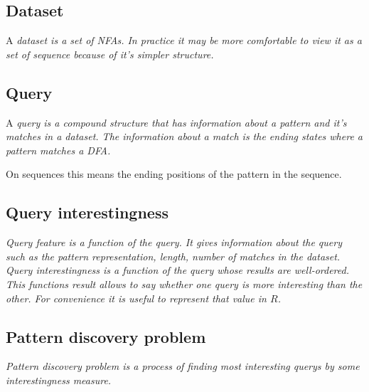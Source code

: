 \subsection{Dataset}

A \em{dataset} is a set of NFAs. In practice it may be more comfortable
to view it as a set of sequence because of it's simpler structure.

\subsection{Query}

A \em{query} is a compound structure that has information about a
pattern and it's matches in a dataset. The information about a
match is the ending states where a pattern matches a DFA.

On sequences this means the ending positions of the pattern 
in the sequence.

\subsection{Query interestingness}

\em{Query feature} is a function of the query. It gives 
information about the query such as the pattern representation, 
length, number of matches in the dataset.
\em{Query interestingness} is a function of the query whose
results are well-ordered. This functions result allows to
say whether one query is more interesting than the other.
For convenience it is useful to represent that value in
$R$.

\subsection{Pattern discovery problem}

\em{Pattern discovery problem} is a process of finding
most interesting querys by some interestingness measure.

